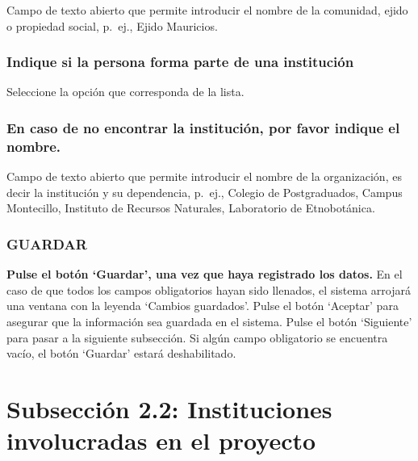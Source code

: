 \documentclass[
]{book}
\begin{document}
Campo de texto abierto que permite introducir el nombre de la comunidad, ejido o propiedad social, p.~ej., Ejido Mauricios.

\hypertarget{indique-si-la-persona-forma-parte-de-una-instituciuxf3n}{%
\subsection{Indique si la persona forma parte de una institución}\label{indique-si-la-persona-forma-parte-de-una-instituciuxf3n}}

Seleccione la opción que corresponda de la lista.

\hypertarget{en-caso-de-no-encontrar-la-instituciuxf3n-por-favor-indique-el-nombre.}{%
\subsection{En caso de no encontrar la institución, por favor indique el nombre.}\label{en-caso-de-no-encontrar-la-instituciuxf3n-por-favor-indique-el-nombre.}}

Campo de texto abierto que permite introducir el nombre de la organización, es decir la institución y su dependencia, p.~ej., Colegio de Postgraduados, Campus Montecillo, Instituto de Recursos Naturales, Laboratorio de Etnobotánica.

\hypertarget{guardar-1}{%
\subsection{GUARDAR}\label{guardar-1}}

\textbf{Pulse el botón `Guardar', una vez que haya registrado los datos.} En el caso de que todos los campos obligatorios hayan sido llenados, el sistema arrojará una ventana con la leyenda `Cambios guardados'.
Pulse el botón `Aceptar' para asegurar que la información sea guardada en el sistema.
Pulse el botón `Siguiente' para pasar a la siguiente subsección.
Si algún campo obligatorio se encuentra vacío, el botón `Guardar' estará deshabilitado.

\hypertarget{subsecciuxf3n-2.2-instituciones-involucradas-en-el-proyecto}{%
\chapter*{Subsección 2.2: Instituciones involucradas en el proyecto}\label{subsecciuxf3n-2.2-instituciones-involucradas-en-el-proyecto}}
\end{document}
